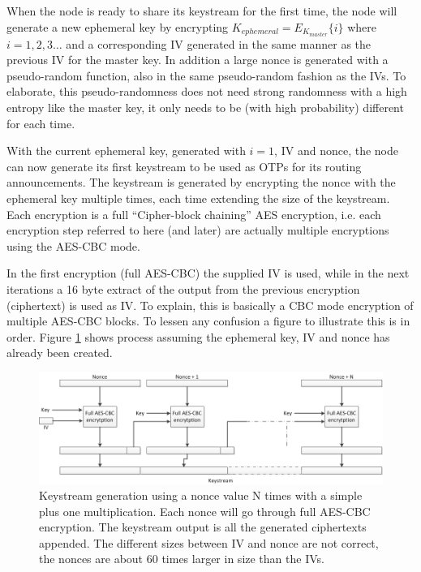 When the node is ready to share its keystream for the first time, the node will
generate a new ephemeral key by encrypting $K_{ephemeral} =
E_{K_{master}}\{i\}$ where $i = 1,2,3\ldots$ and a corresponding \ac{IV}
generated in the same manner as the previous \ac{IV} for the master key. In
addition a large nonce is generated with a pseudo-random function, also in the
same pseudo-random fashion as the \acp{IV}. To elaborate, this pseudo-randomness
does not need strong randomness with a high entropy like the master key, it only
needs to be (with high probability) different for each time.

With the current ephemeral key, generated with $i = 1$, \ac{IV} and nonce, the
node can now generate its first keystream to be used as \acp{OTP} for its
routing announcements. The keystream is generated by encrypting the nonce with
the ephemeral key multiple times, each time extending the size of the
keystream. Each encryption is a full ``Cipher-block chaining'' AES encryption,
i.e. each encryption step referred to here (and later) are actually multiple
encryptions using the AES-CBC mode.

In the first encryption (full AES-CBC) the supplied \ac{IV} is used, while in
the next iterations a 16 byte extract of the output from the previous encryption
(ciphertext) is used as \ac{IV}. To explain, this is basically a \ac{CBC} mode
encryption of multiple AES-CBC blocks. To lessen any confusion a figure to
illustrate this is in order. Figure \ref{fig:keystream_generation} shows
process assuming the ephemeral key, IV and nonce has already been created.

\begin{figure}[h]
	\centering
  	\includegraphics[width=\textwidth]{images/keystream_generation.png}
  	\caption{Keystream generation using a nonce value N times with a simple plus
  		one multiplication. Each nonce will go through full AES-CBC encryption. The
  		keystream output is all the generated ciphertexts appended. The different
  		sizes between IV and nonce are not correct, the nonces are about 60 times
  		larger in size than the IVs.}
	\label{fig:keystream_generation}
\end{figure}

